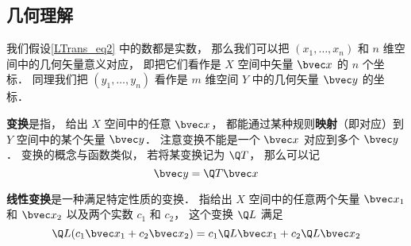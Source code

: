 \subsection{几何理解}

我们假设\autoref{LTrans_eq2} 中的数都是实数， 那么我们可以把 $(x_1, \dots, x_n)$ 和 $n$ 维空间中的几何矢量意义对应， 即把它们看作是 $X$ 空间中矢量 $\bvec x$ 的 $n$ 个坐标． 同理我们把 $(y_1, \dots, y_n)$ 看作是 $m$ 维空间 $Y$ 中的几何矢量 $\bvec y$ 的坐标．

\textbf{变换}是指， 给出 $X$ 空间中的任意 $\bvec x$， 都能通过某种规则\textbf{映射}（即对应）到 $Y$ 空间中的某个矢量 $\bvec y$． 注意变换不能是一个 $\bvec x$ 对应到多个 $\bvec y$． 变换的概念与函数类似， 若将某变换记为 $\Q T$， 那么可以记
\begin{equation}
\bvec y = \Q T\bvec x
\end{equation}

\textbf{线性变换}是一种满足特定性质的变换． 指给出 $X$ 空间中的任意两个矢量 $\bvec x_1$ 和 $\bvec x_2$ 以及两个实数 $c_1$ 和 $c_2$， 这个变换 $\Q L$ 满足
\begin{equation}
\Q L(c_1 \bvec x_1 + c_2 \bvec x_2) = c_1 \Q L \bvec x_1 + c_2 \Q L \bvec x_2
\end{equation}

